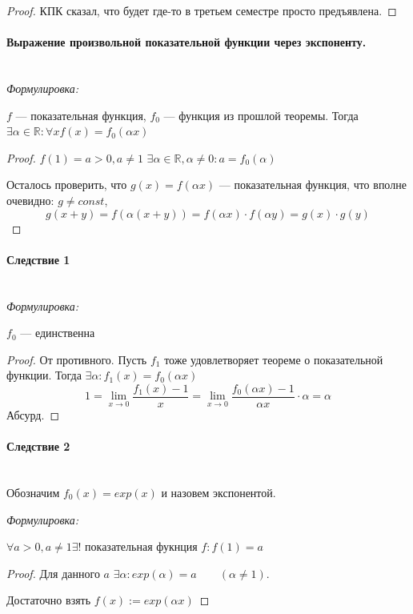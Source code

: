 \documentclass{article}
\let\vanillaparagraph\paragraph
\renewcommand{\paragraph}[1]{\vanillaparagraph{#1}\mbox{}\\}
\begin{document}
\begin{proof}
КПК сказал, что будет где-то в третьем семестре просто предъявлена.
\end{proof}

\paragraph{Выражение произвольной показательной функции через экспоненту.}
\textit{Формулировка:}

$f$ --- показательная функция, $f_0$ --- функция из прошлой теоремы. Тогда  $\exists \alpha \in \mathbb{R}: \forall x f(x) = f_0(\alpha x)$

\begin{proof}
$f(1) = a > 0, a\neq 1$ $\exists \alpha \in \mathbb{R}, \alpha \neq 0: a = f_0(\alpha)$

Осталось проверить, что $g(x) = f(\alpha x)$ --- показательная функция, что вполне очевидно: $g \neq const$,
\begin{equation*}
g(x + y) = f(\alpha(x + y)) = f(\alpha x) \cdot f(\alpha y) = g(x) \cdot g(y)
\end{equation*}
\end{proof}

\paragraph{Следствие 1}
\textit{Формулировка:}

$f_0$ --- единственна

\begin{proof}
От противного. Пусть $f_1$ тоже удовлетворяет теореме о показательной функции. Тогда $\exists \alpha: f_1(x) = f_0(\alpha x)$
\begin{equation*}
1 = \lim_{x\to 0} \frac{f_1(x) - 1} {x} = \lim_{x\to 0} \frac{f_0(\alpha x) - 1} {\alpha x} \cdot \alpha = \alpha
\end{equation*}
Абсурд.
\end{proof}

\paragraph{Следствие 2}
Обозначим $f_0(x) = exp(x)$ и назовем экспонентой.

\textit{Формулировка: }

$\forall a > 0, a\neq 1 \exists!$ показательная фукнция $f: f(1) = a$

\begin{proof}
Для данного $a$ $\exists \alpha: exp(\alpha) = a\qquad(\alpha \neq 1).$

Достаточно взять $f(x) := exp(\alpha x)$
\end{proof}
\end{document}
